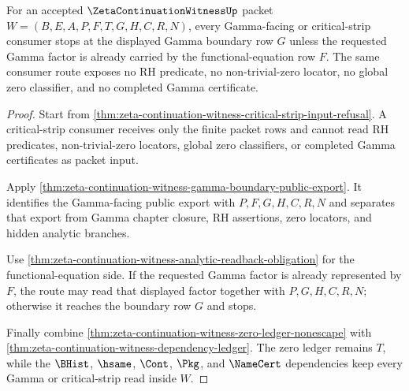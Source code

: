 \begin{theorem}
\label{thm:zeta-continuation-witness-gamma-critical-strip-readiness}
For an accepted $\ZetaContinuationWitnessUp$ packet $W=(B,E,A,P,F,T,G,H,C,R,N)$, every Gamma-facing or critical-strip consumer stops at the displayed Gamma boundary row $G$ unless the requested Gamma factor is already carried by the functional-equation row $F$. The same consumer route exposes no RH predicate, no non-trivial-zero locator, no global zero classifier, and no completed Gamma certificate.
\end{theorem}
\begin{proof}
Start from \autoref{thm:zeta-continuation-witness-critical-strip-input-refusal}. A critical-strip consumer receives only the finite packet rows and cannot read RH predicates, non-trivial-zero locators, global zero classifiers, or completed Gamma certificates as packet input.

Apply \autoref{thm:zeta-continuation-witness-gamma-boundary-public-export}. It identifies the Gamma-facing public export with $P,F,G,H,C,R,N$ and separates that export from Gamma chapter closure, RH assertions, zero locators, and hidden analytic branches.

Use \autoref{thm:zeta-continuation-witness-analytic-readback-obligation} for the functional-equation side. If the requested Gamma factor is already represented by $F$, the route may read that displayed factor together with $P,G,H,C,R,N$; otherwise it reaches the boundary row $G$ and stops.

Finally combine \autoref{thm:zeta-continuation-witness-zero-ledger-nonescape} with \autoref{thm:zeta-continuation-witness-dependency-ledger}. The zero ledger remains $T$, while the $\BHist$, $\hsame$, $\Cont$, $\Pkg$, and $\NameCert$ dependencies keep every Gamma or critical-strip read inside $W$.
\end{proof}
